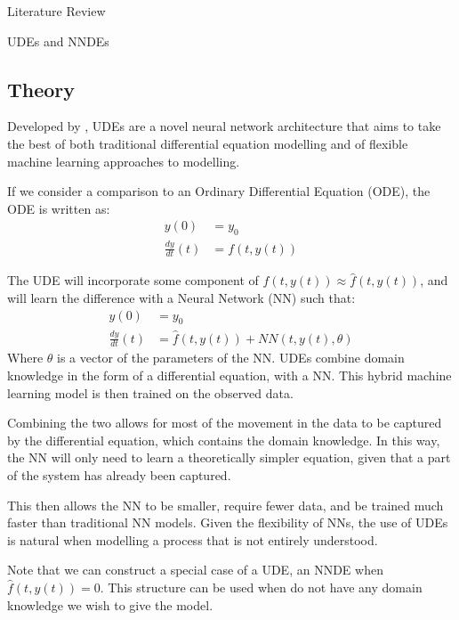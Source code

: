 \documentclass[12pt]{amsbook}
\begin{document}
\begin{chapter}{Literature Review}
\begin{section}{UDEs and NNDEs}
        \subsection{Theory}

            Developed by \cite{SciML_C_Rak}, UDEs are a novel neural network architecture that aims to take the best of both traditional differential equation modelling and of flexible machine learning approaches to modelling. 

            If we consider a comparison to an Ordinary Differential Equation (ODE), the ODE is written as:
            \begin{align}
                y(0) &= y_0 \\
                \frac{dy}{dt}(t)&=f(t,y(t))
            \end{align}
            
            The UDE will incorporate some component of $f(t,y(t))\approx \hat f(t,y(t))$, and will learn the difference with a Neural Network (NN) such that:
            \begin{align}
                \label{UDE}
                y(0) &= y_0 \\
                \frac{dy}{dt}(t)&=\hat f(t,y(t))+NN(t,y(t), \theta)
            \end{align}
            Where $\theta$ is a vector of the parameters of the NN.
            UDEs combine domain knowledge in the form of a differential equation, with a NN. This hybrid machine learning model is then trained on the observed data.
            
            Combining the two allows for most of the movement in the data to be captured by the differential equation, which contains the domain knowledge. In this way, the NN will only need to learn a theoretically simpler equation, given that a part of the system has already been captured. 
            
            This then allows the NN to be smaller, require fewer data, and be trained much faster than traditional NN models. Given the flexibility of NNs, the use of UDEs is natural when modelling a process that is not entirely understood\cite{kidger2022neural}.

            Note that we can construct a special case of a UDE, an NNDE when $\hat f(t,y(t))=0$. This structure can be used when do not have any domain knowledge we wish to give the model.
            

\end{section}
\end{chapter}
\end{document}
